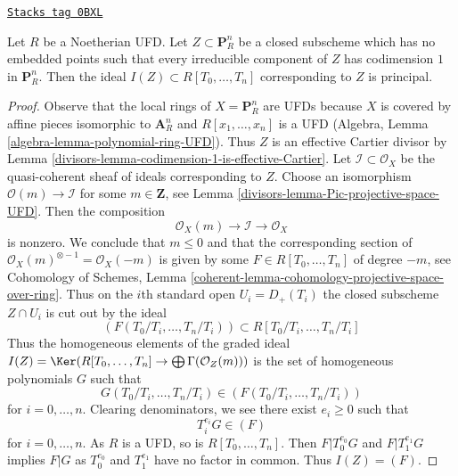 \begin{lemma}
\label{divisors-lemma-equation-codim-1-in-projective-space}
\href{https://stacks.math.columbia.edu/tag/0BXL}{\texttt{Stacks tag 0BXL}}

Let $R$ be a Noetherian UFD. Let $Z \subset \mathbf{P}^n_R$ be a
closed subscheme
which has no embedded points such that every irreducible component
of $Z$ has codimension $1$ in $\mathbf{P}^n_R$.
Then the ideal $I(Z) \subset R[T_0, \ldots, T_n]$ corresponding
to $Z$ is principal.
\end{lemma}

\begin{proof}

Observe that the local rings of $X = \mathbf{P}^n_R$ are
UFDs because $X$ is covered by affine pieces isomorphic
to $\mathbf{A}^n_R$ and $R[x_1, \ldots, x_n]$ is a UFD
(Algebra, Lemma \ref{algebra-lemma-polynomial-ring-UFD}).
Thus $Z$ is an effective Cartier divisor by
Lemma \ref{divisors-lemma-codimension-1-is-effective-Cartier}.
Let $\mathcal{I} \subset \mathcal{O}_X$ be the quasi-coherent
sheaf of ideals corresponding to $Z$.
Choose an isomorphism $\mathcal{O}(m) \to \mathcal{I}$
for some $m \in \mathbf{Z}$, see
Lemma \ref{divisors-lemma-Pic-projective-space-UFD}.
Then the composition
$$
\mathcal{O}_X(m) \to \mathcal{I} \to \mathcal{O}_X
$$
is nonzero. We conclude that $m \leq 0$ and that the corresponding
section of $\mathcal{O}_X(m)^{\otimes -1} = \mathcal{O}_X(-m)$
is given by some $F \in R[T_0, \ldots, T_n]$ of degree $-m$, see
Cohomology of Schemes, Lemma
\ref{coherent-lemma-cohomology-projective-space-over-ring}.
Thus on the $i$th standard open $U_i = D_+(T_i)$ the
closed subscheme $Z \cap U_i$ is cut out by the ideal
$$
(F(T_0/T_i, \ldots, T_n/T_i)) \subset R[T_0/T_i, \ldots, T_n/T_i]
$$
Thus the homogeneous elements of the graded ideal
$I(Z) = \Ker(R[T_0, \ldots, T_n] \to \bigoplus \Gamma(\mathcal{O}_Z(m)))$
is the set of homogeneous polynomials $G$ such that
$$
G(T_0/T_i, \ldots, T_n/T_i) \in (F(T_0/T_i, \ldots, T_n/T_i))
$$
for $i = 0, \ldots, n$. Clearing denominators, we see there exist
$e_i \geq 0$ such that
$$
T_i^{e_i}G \in (F)
$$
for $i = 0, \ldots, n$. As $R$ is a UFD, so is $R[T_0, \ldots, T_n]$.
Then $F | T_0^{e_0}G$ and $F | T_1^{e_1}G$ implies $F | G$ as
$T_0^{e_0}$ and $T_1^{e_1}$ have no factor in common. Thus $I(Z) = (F)$.
\end{proof}

